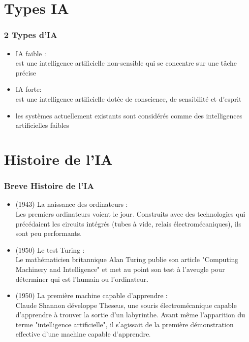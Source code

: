 \documentclass{beamer}
\begin{document}
	\section{Types IA}
	\begin{frame}
	\frametitle{2 Types d'IA}
	\begin{itemize}
		\itemsep0.5em
		\item IA faible  :\\
		est une intelligence artificielle non-sensible qui se concentre sur une tâche précise
		 
		 \item IA forte: \\
		est une intelligence artificielle dotée de conscience, de sensibilité et d'esprit
		\item les systèmes actuellement existants sont considérés comme des intelligences artificielles faibles
	\end{itemize}
	\end{frame}
	
	
	\section{Histoire de l'IA}
	\begin{frame}
	\frametitle{Breve Histoire de l'IA}
	\begin{itemize}
		\itemsep0.5em
		\item (1943) La naissance des ordinateurs :\\
		 Les premiers ordinateurs voient le jour. Construits avec des technologies qui précédaient les circuits intégrés (tubes à vide, relais électromécaniques), ils sont peu performants.
		 
		 \item (1950) Le test Turing : \\
		 Le mathématicien britannique Alan Turing publie son article "Computing Machinery and Intelligence" et met au point son test à l’aveugle pour déterminer qui est l’humain ou l’ordinateur.

		 \item (1950) La première machine capable d’apprendre :\\
		 Claude Shannon développe Theseus, une souris électromécanique capable d’apprendre à trouver la sortie d’un labyrinthe. Avant même l’apparition du terme "intelligence artificielle", il s’agissait de la première démonstration effective d’une machine capable d’apprendre.

	\end{itemize}
	\end{frame}
	
\end{document}

